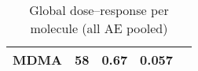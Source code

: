 \begin{table}[!h]
\centering
\caption{Global dose–response per molecule (all AE pooled)}
\centering
\begin{tabular}[t]{lrlll}
\toprule
MDMA & 58 & 0.67 & 0.057 & \\
\bottomrule
\end{tabular}
\end{table}
